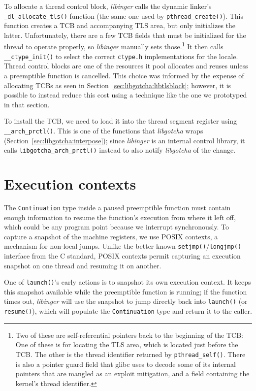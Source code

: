 To allocate a thread control block, \textit{libinger} calls the dynamic linker's
\texttt{\_dl\_allocate\_tls()} function (the same one used by
\texttt{pthread\_create()}).  This function creates a TCB and accompanying TLS area,
but only initializes the latter.  Unfortunately, there are a few TCB fields that must
be initialized for the thread to operate properly, so \textit{libinger} manually sets
those.\footnote{Two of these are self-referential pointers back to the beginning of
the TCB:  One of these is for locating the TLS area, which is located just before the
TCB.  The other is the thread identifier returned by \texttt{pthread\_self()}.  There
is also a pointer guard field that glibc uses to decode some of its internal pointers
that are mangled as an exploit mitigation, and a field containing the kernel's thread
identifier.}  It then calls \texttt{\_\_ctype\_init()} to select the correct
\texttt{ctype.h} implementations for the locale.  Thread control blocks are one of
the resources it pool allocates and reuses unless a preemptible function is
cancelled.  This choice was informed by the expense of allocating TCBs as seen in
Section~\ref{sec:libgotcha:libtlsblock}; however, it is possible to instead reduce
this cost using a technique like the one we prototyped in that section.

To install the TCB, we need to load it into the thread segment register using
\texttt{\_\_arch\_prctl()}.  This is one of the functions that \textit{libgotcha}
wraps (Section~\ref{sec:libgotcha:interpose}); since \textit{libinger} is an internal
control library, it calls \texttt{libgotcha\_arch\_prctl()} instead to also notify
\textit{libgotcha} of the change.


\section{Execution contexts}
\label{sec:libinger:contexts}

The \texttt{Continuation} type inside a paused preemptible function must contain
enough information to resume the function's execution from where it left off, which
could be any program point because we interrupt synchronously.  To capture a snapshot
of the machine registers, we use POSIX contexts, a mechanism for non-local jumps.
Unlike the better known \texttt{setjmp()}/\texttt{longjmp()} interface from the C
standard, POSIX contexts permit capturing an execution snapshot on one thread and
resuming it on another.

One of \texttt{launch()}'s early actions is to snapshot its own execution context.
It keeps this snapshot available while the preemptible function is running; if the
function times out, \textit{libinger} will use the snapshot to jump directly back
into \texttt{launch()} (or \texttt{resume()}), which will populate the
\texttt{Continuation} type and return it to the caller.


